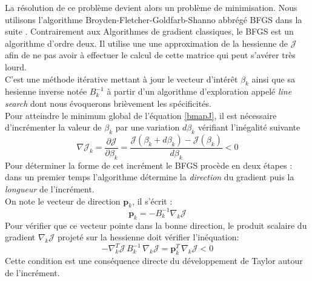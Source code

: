 \documentclass[a4paper,12pt]{article}
\newcommand{\bepar}[1]{
	\left( #1 \right)  
}
\newcommand{\J}{\mathcal{J}}
\numberwithin{equation}{section} %
\begin{document}
\noindent La résolution de ce problème devient alors un problème de minimisation. Nous utilisons l'algorithme Broyden-Fletcher-Goldfarb-Shanno abbrégé BFGS dans la suite \citep{nocedal2006numerical}.
Contrairement aux Algorithmes de gradient classiques, le BFGS est un algorithme d'ordre deux. Il utilise une une approximation de la hessienne de $\J$ afin de ne pas avoir à effectuer le calcul de cette matrice qui peut s'avérer très lourd.\\
C'est une méthode itérative mettant à jour le vecteur d'intérêt $\beta_k$ ainsi que sa hesienne inverse notée $B^{-1}_k$ à partir d'un algorithme d'exploration appelé \textit{line search} dont nous évoquerons brièvement les spécificités.\\
Pour atteindre le minimum global de l'équation \eqref{bmapJ}, il est nécessaire d'incrémenter la valeur de $\beta_k$ par une variation $d\beta_k$ vérifiant l'inégalité suivante
\begin{equation}
\nabla\J_k = \frac{\partial \J}{\partial \beta_k} = \frac{\J\bepar{\beta_k+ d\beta_k} - \J\bepar{\beta_k}}{d\beta_k} < 0
\end{equation}
Pour déterminer la forme de cet incrément le BFGS procède en deux étapes : dans un premier temps l'algorithme détermine la \textit{direction} du gradient puis la \textit{longueur} de l'incrément. \\
On note le vecteur de direction $\mathbf{p}_k$, il s'écrit :
\begin{equation}
\mathbf{p}_k = -B_k^{-1}\nabla_k\J
\end{equation}
Pour vérifier que ce vecteur pointe dans la bonne direction, le produit scalaire du gradient $\nabla_k\J$ projeté sur la hessienne doit vérifier l'inéquation:
\begin{equation}
-\nabla_k^T\J\, B_k^{-1}\, \nabla_k\J = \mathbf{p}_k^T\, \nabla_k\J < 0
\end{equation}
Cette condition est une conséquence directe du développement de Taylor autour de l'incrément.\\
\end{document}
